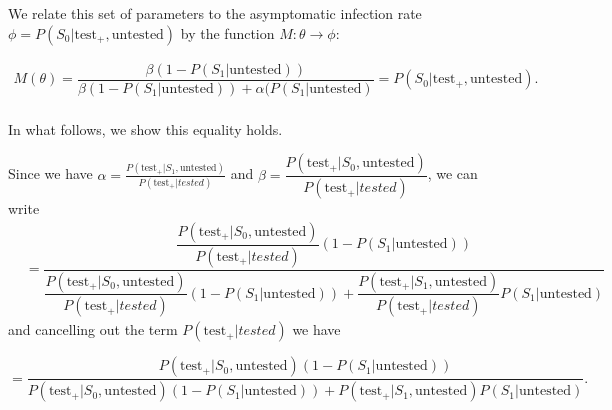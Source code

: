\documentclass[12pt,twoside]{smiththesis}
\begin{document}
We relate this set of parameters to the asymptomatic infection rate \(\phi = P(S_0|\text{test}_+, \text{untested})\) by the function \(M: \theta \to \phi\):
\begin{tcolorbox}
\vspace{2 mm}
\begin{align*}   
 M(\theta)  = \dfrac{\beta (1- P(S_1|\text{untested}))}{\beta(1- P(S_1|\text{untested})) + \alpha(P(S_1|\text{untested})} = P(S_0|\text{test}_+, \text{untested}).\\
\end{align*}
\end{tcolorbox}
In what follows, we show this equality holds.

\noindent Since we have \(\alpha = \frac{P(\text{test}_+|S_1, \text{untested})}{P(\text{test}_+|tested)}\) and \(\beta = \dfrac{P(\text{test}_+|S_0, \text{untested})}{P(\text{test}_+|tested)}\), we can write
\begin{align*}  &= \dfrac{\dfrac{P(\text{test}_+|S_0, \text{untested})}{P(\text{test}_+|tested)}(1 - P(S_1|\text{untested}))}{\dfrac{P(\text{test}_+|S_0, \text{untested})}{P(\text{test}_+|tested)}(1-P(S_1|\text{untested})) + \dfrac{P(\text{test}_+|S_1, \text{untested})}{P(\text{test}_+|tested)} P(S_1|\text{untested})}
\end{align*}
and cancelling out the term \(P(\text{test}_+|tested)\) we have

\[ = \dfrac{{P(\text{test}_+|S_0, \text{untested})}(1 - P(S_1|\text{untested}))}{P(\text{test}_+|S_0, \text{untested})(1-P(S_1|\text{untested})) + P(\text{test}_+|S_1, \text{untested}) P(S_1|\text{untested})}.\]
\end{document}
